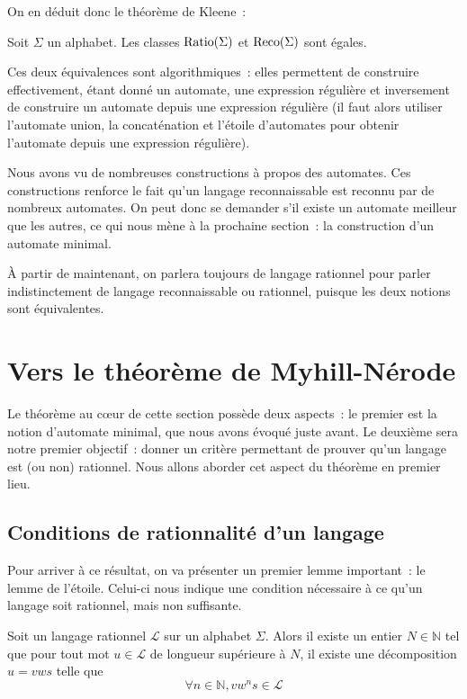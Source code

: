 On en déduit donc le théorème de Kleene~:

\begin{theorem}[Kleene]
  Soit $\Sigma$ un alphabet. Les classes $\operatorname{Ratio}(\Sigma)$ et $\operatorname{Reco}(\Sigma)$
  sont égales.
\end{theorem}

\begin{remark}
  Ces deux équivalences sont algorithmiques~: elles permettent de construire
  effectivement, étant donné un automate, une expression régulière et
  inversement de construire un automate depuis une expression régulière (il faut
  alors utiliser l'automate union, la concaténation et l'étoile d'automates pour
  obtenir l'automate depuis une expression régulière).
\end{remark}

Nous avons vu de nombreuses constructions à propos des automates. Ces
constructions renforce le fait qu'un langage reconnaissable est reconnu par de
nombreux automates. On peut donc se demander s'il existe un automate meilleur
que les autres, ce qui nous mène à la prochaine section~: la construction d'un
automate minimal.

\`A partir de maintenant, on parlera toujours de langage rationnel pour parler
indistinctement de langage reconnaissable ou rationnel, puisque les deux notions
sont équivalentes.

\section{Vers le théorème de Myhill-Nérode}

Le théorème au c\oe ur de cette section possède deux aspects~: le premier est
la notion d'automate minimal, que nous avons évoqué juste avant. Le deuxième
sera notre premier objectif~: donner un critère permettant de prouver qu'un
langage est (ou non) rationnel. Nous allons aborder cet aspect du théorème en
premier lieu.

\subsection{Conditions de rationnalité d'un langage}

Pour arriver à ce résultat, on va présenter un premier lemme important~: le
lemme de l'étoile. Celui-ci nous indique une condition nécessaire à ce qu'un
langage soit rationnel, mais non suffisante.

\begin{lemma}[de l'étoile]
  Soit un langage rationnel $\mathcal L$ sur un alphabet $\Sigma$. Alors il
  existe un entier $N \in \mathbb N$ tel que pour tout mot $u\in\mathcal L$ de
  longueur supérieure à $N$, il existe une décomposition $u = vws$ telle que
  \[\forall n \in \mathbb N, vw^ns \in \mathcal L\]
\end{lemma}

